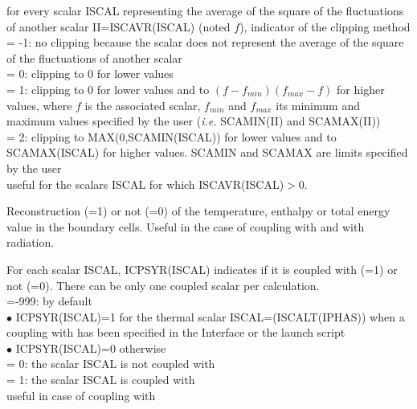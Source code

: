 {for every scalar ISCAL representing the average of the square of the
fluctuations of another scalar II=ISCAVR(ISCAL) (noted $f$),
indicator of the clipping method\\
\hspace*{1.3cm}= -1: no clipping because the scalar does not represent
the average of the square of the fluctuations of another scalar\\
\hspace*{1.3cm}= 0: clipping to 0 for lower values\\
\hspace*{1.3cm}= 1: clipping to 0 for lower values and to
\mbox{$(f-f_{min})(f_{max}-f)$} for higher values, where $f$ is
the associated scalar, $f_{min}$ and $f_{max}$ its minimum and maximum
values specified by the user ({\em i.e.} SCAMIN(II) and SCAMAX(II)) \\
\hspace*{1.3cm}= 2: clipping to MAX(0,SCAMIN(ISCAL)) for lower
values and to SCAMAX(ISCAL) for higher values. SCAMIN and SCAMAX
are limits specified by the user\\
useful for the scalars ISCAL for which ISCAVR(ISCAL)$>$0.}

{Reconstruction (=1) or not (=0) of the temperature, enthalpy or total energy
value in the boundary cells. Useful in the case of coupling with \syrthes
and with radiation.}

{For each scalar ISCAL, ICPSYR(ISCAL) indicates if it is
coupled with \syrthes (=1) or not (=0).
There can be only one coupled scalar per calculation.\\
\hspace*{1.3cm}=-999: by default\\
\hspace*{2.cm} $\bullet$ ICPSYR(ISCAL)=1 for the thermal scalar
ISCAL=(ISCALT(IPHAS)) when a coupling with \syrthes has been specified in the
Interface or the launch script\\
\hspace*{2.cm} $\bullet$ ICPSYR(ISCAL)=0 otherwise\\
\hspace*{1.3cm}= 0: the scalar ISCAL is not coupled with \syrthes\\
\hspace*{1.3cm}= 1: the scalar ISCAL is coupled with \syrthes\\
useful in case of coupling with \syrthes}


